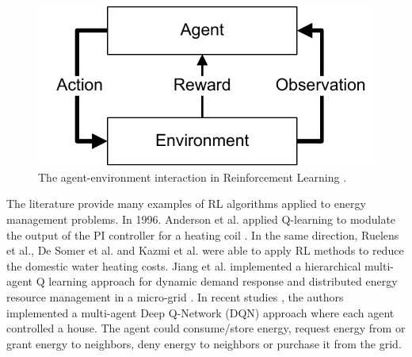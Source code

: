 %
\begin{figure}[b]
\sidecaption
\includegraphics[scale=.65]{images/Single_Agent_RL.pdf}
%
%
\caption{The agent-environment interaction in Reinforcement Learning \cite{Sutton9780262039246}.}
\label{fig:1}       %
\end{figure}


The literature provide many examples of RL algorithms applied to energy management problems. In 1996. Anderson et al. applied Q-learning to modulate the output of the PI controller for a heating coil \cite{ANDERSON1997421, Li6519950}. In the same direction, Ruelens et al.\cite{Ruelens7038106, Ruelens7792709}, De Somer et al. \cite{Somer8260152} and Kazmi et al. \cite{KAZMI2018159} were able to apply RL methods to reduce the domestic water heating costs. Jiang et al. implemented a hierarchical multi-agent Q learning approach for dynamic demand response and distributed energy resource management in a micro-grid \cite{Jiang6912013}. In recent studies \cite{ANVARIMOGHADDAM201741, prasad2018multiagent, LU2018220}, the authors implemented a multi-agent Deep Q-Network (DQN) \cite{mnih2013playing} approach where each agent controlled a house. The agent could consume/store energy, request energy from or grant energy to neighbors, deny energy to neighbors or purchase it from the grid.

